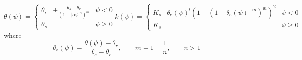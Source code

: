 \begin{subequations}
\label{eq:van-genuchten}
\begin{equation}
\label{eq:van-genuchten-water-retention}
    \theta(\psi) =
    \left\{\begin{aligned}
        \theta_r& + \frac{\theta_s- \theta_r}{(1+|\alpha \psi|^n)^m}  & \psi < 0 \\
        \theta_s& & \psi \ge 0
    \end{aligned}\right.
\end{equation}
\begin{equation}
\label{eq:van-genuchten-hydraulic-conductivity}
    k(\psi) =
    \left\{\begin{aligned}
        K_s & \theta_e(\psi)^l(1-(1- \theta_e(\psi)^{-m})^m)^2 & \psi < 0 \\
        K_s& & \psi \ge 0
    \end{aligned}\right.
\end{equation}
\end{subequations}
where
\begin{equation}
\label{eq:van-genuchten-params}
    \theta_e(\psi) = \frac{\theta(\psi) - \theta_r}{\theta_s - \theta_r},
    \qquad
    m=1- \frac{1}{n},
    \qquad
    n > 1
\end{equation}
